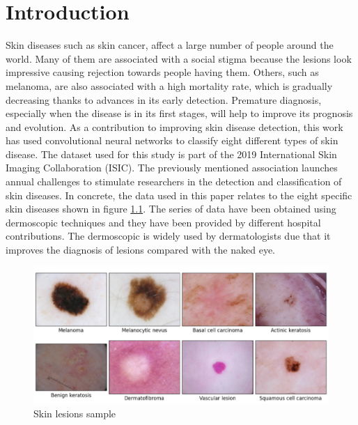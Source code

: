 \chapter{Introduction}
\label{chapter: introduction}


Skin diseases such as skin cancer,  affect a large number of people around the world. Many of them are associated with a social stigma because the lesions look impressive causing rejection towards people having them.  Others, such as melanoma, are also associated with a high mortality rate, which is gradually decreasing thanks to advances in its early detection. Premature diagnosis, especially when the disease is in its first stages, will help to improve its prognosis and evolution. As a contribution to improving skin disease detection, this work has used convolutional neural networks to classify eight different types of skin disease. 
The dataset used for this study is part of the 2019 International Skin Imaging Collaboration (ISIC). The previously mentioned association launches annual challenges to stimulate researchers in the detection and classification of skin diseases. In concrete, the data used in this paper relates to the eight specific skin diseases shown in figure \ref{fig: skin_lesions_sample}. The series of data have been obtained using dermoscopic techniques and they have been provided by different hospital contributions. The dermoscopic is widely used by dermatologists due that it improves the diagnosis of lesions compared with the naked eye.


\begin{figure}[ht]
    \begin{center}
        \includegraphics[scale=0.5]{images/Introduccion/skin_lesion_sample.png}
        \caption{Skin lesions sample}
    \label{fig: skin_lesions_sample}    
    \end{center}
\end{figure}


